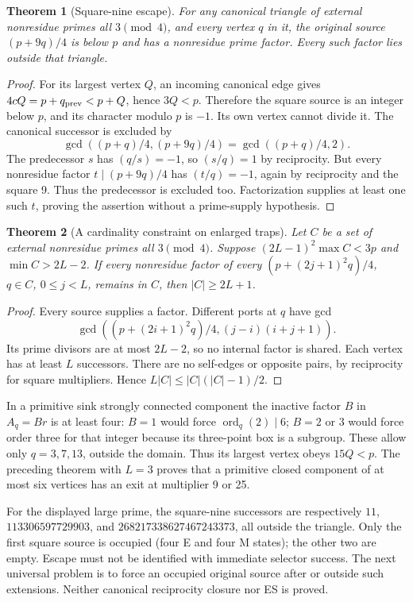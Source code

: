 \documentclass[11pt,reqno]{amsart}
\newtheorem{theorem}{Theorem}\newtheorem{lemma}[theorem]{Lemma}
\begin{document}
\begin{theorem}[Square-nine escape]\label{nine}
For any canonical triangle of external nonresidue primes all $3\pmod4$, and
every vertex $q$ in it, the original source $(p+9q)/4$ is below $p$ and has a
nonresidue prime factor. Every such factor lies outside that triangle.
\end{theorem}
\begin{proof}
For its largest vertex $Q$, an incoming canonical edge gives
$4cQ=p+q_{\rm prev}<p+Q$, hence $3Q<p$. Therefore the square source is an
integer below $p$, and its character modulo $p$ is $-1$.
Its own vertex cannot divide it. The canonical successor is excluded by
\[
 \gcd((p+q)/4,(p+9q)/4)=\gcd((p+q)/4,2).
\]
The predecessor $s$ has $(q/s)=-1$, so $(s/q)=1$ by reciprocity. But every
nonresidue factor $t\mid(p+9q)/4$ has $(t/q)=-1$, again by reciprocity and the
square 9. Thus the predecessor is excluded too. Factorization supplies at least
one such $t$, proving the assertion without a prime-supply hypothesis.
\end{proof}

\begin{theorem}[A cardinality constraint on enlarged traps]
Let $C$ be a set of external nonresidue primes all $3\pmod4$. Suppose
$(2L-1)^2\max C<3p$ and $\min C>2L-2$. If every nonresidue factor of every
$(p+(2j+1)^2q)/4$, $q\in C$, $0\le j<L$, remains in $C$, then $|C|\ge2L+1$.
\end{theorem}
\begin{proof}
Every source supplies a factor. Different ports at $q$ have gcd
\[
 \gcd\left((p+(2i+1)^2q)/4,(j-i)(i+j+1)\right).
\]
Its prime divisors are at most $2L-2$, so no internal factor is shared. Each
vertex has at least $L$ successors. There are no self-edges or opposite pairs,
by reciprocity for square multipliers. Hence
$L|C|\le|C|(|C|-1)/2$.
\end{proof}

In a primitive sink strongly connected component the inactive factor $B$ in $A_q=Br$ is at least
four: $B=1$ would force $\operatorname{ord}_q(2)\mid6$; $B=2$ or $3$ would force
order three for that integer because its three-point box is a subgroup. These
allow only $q=3,7,13$, outside the domain. Thus its largest vertex obeys
$15Q<p$. The preceding theorem with $L=3$ proves that a primitive closed
component of at most six vertices has an exit at multiplier 9 or 25.

For the displayed large prime, the square-nine successors are respectively
$11$, $113306597729903$, and $268217338627467243373$, all outside the triangle.
Only the first square source is occupied (four E and four M states); the other
two are empty. Escape must not be identified with immediate selector success.
The next universal problem is to force an occupied original source after or
outside such extensions. Neither canonical reciprocity closure nor ES is proved.
\end{document}
